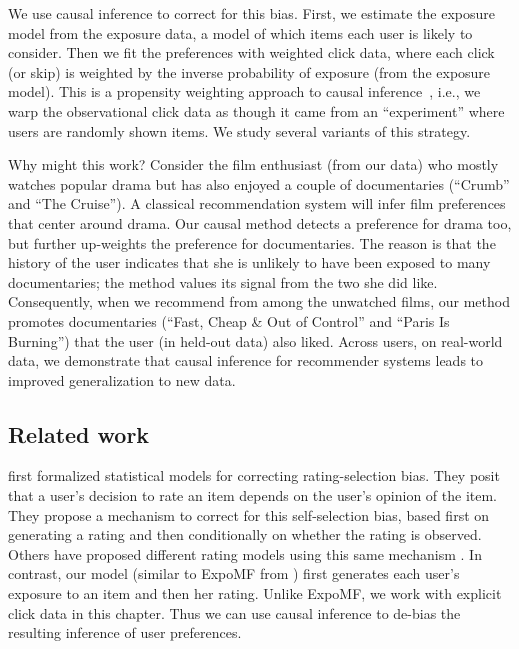 We use causal inference to correct for this bias. First, we estimate
the exposure model from the exposure data, a model of which items each
user is likely to consider. Then we fit the preferences with weighted
click data, where each click (or skip) is weighted by the inverse
probability of exposure (from the exposure model). This is a
propensity weighting approach to causal
inference~\citep{imbens2015causal}, i.e., we warp the observational
click data as though it came from an ``experiment'' where users are
randomly shown items. We study several variants of this strategy.

Why might this work?  Consider the film enthusiast (from our data) who
mostly watches popular drama but has also enjoyed a couple of
documentaries (``Crumb'' and ``The Cruise'').  A classical
recommendation system will infer film preferences that center around
drama.  Our causal method detects a preference for drama too, but
further up-weights the preference for documentaries. The reason is
that the history of the user indicates that she is unlikely to have
been exposed to many documentaries; the method values its signal from
the two she did like.  Consequently, when we recommend from among the
unwatched films, our method promotes documentaries (``Fast, Cheap \&
Out of Control'' and ``Paris Is Burning'') that the user (in held-out
data) also liked.  Across users, on real-world data, we demonstrate
that causal inference for recommender systems leads to improved
generalization to new data.



\subsection{Related work} 
\citet{Marlin09NMAR} first formalized
statistical models for correcting rating-selection bias. They posit
that a user's decision to rate an item depends on the user's opinion
of the item. They propose a mechanism to correct for this self-selection
bias, based first on generating a rating and then conditionally on
whether the rating is observed. Others have proposed different rating
models using this same mechanism
\citep{ling12response,HernandezLobato14nmar}. In contrast, our model
(similar to ExpoMF \citep{Liang16exposure} from ) first generates each user's
exposure to an item and then her rating. Unlike
ExpoMF, we work with explicit click data in this chapter. Thus we can
use causal inference to de-bias the resulting inference of user
preferences.

